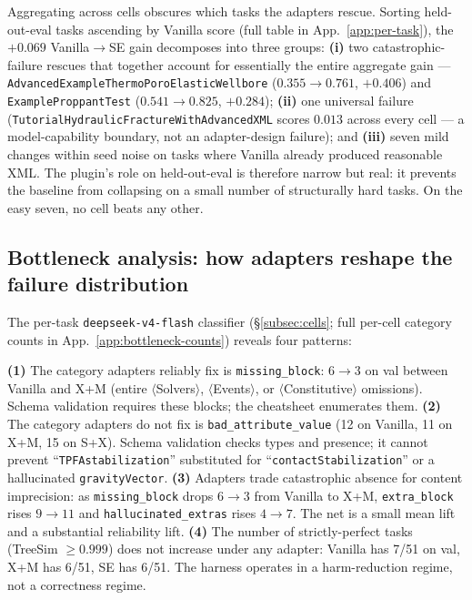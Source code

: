 \documentclass{article}
\begin{document}
Aggregating across cells obscures which tasks the adapters rescue. Sorting held-out-eval tasks ascending by Vanilla score (full table in App.~\ref{app:per-task}), the $+0.069$ Vanilla$\to$SE gain decomposes into three groups: \textbf{(i)} two catastrophic-failure rescues that together account for essentially the entire aggregate gain --- \texttt{AdvancedExampleThermoPoroElasticWellbore} ($0.355 \to 0.761$, $+0.406$) and \texttt{ExampleProppantTest} ($0.541 \to 0.825$, $+0.284$); \textbf{(ii)} one universal failure (\texttt{TutorialHydraulicFractureWithAdvancedXML} scores $0.013$ across every cell --- a model-capability boundary, not an adapter-design failure); and \textbf{(iii)} seven mild changes within seed noise on tasks where Vanilla already produced reasonable XML. The plugin's role on held-out-eval is therefore narrow but real: it prevents the baseline from collapsing on a small number of structurally hard tasks. On the easy seven, no cell beats any other.

\subsection{Bottleneck analysis: how adapters reshape the failure distribution}
\label{subsec:bottleneck-results}

The per-task \texttt{deepseek-v4-flash} classifier (\S\ref{subsec:cells}; full per-cell category counts in App.~\ref{app:bottleneck-counts}) reveals four patterns:

\textbf{(1)} The category adapters reliably fix is \texttt{missing\_block}: $6{\to}3$ on val between Vanilla and X+M (entire $\langle$Solvers$\rangle$, $\langle$Events$\rangle$, or $\langle$Constitutive$\rangle$ omissions). Schema validation requires these blocks; the cheatsheet enumerates them.
\textbf{(2)} The category adapters do not fix is \texttt{bad\_attribute\_value} (12 on Vanilla, 11 on X+M, 15 on S+X). Schema validation checks types and presence; it cannot prevent ``\texttt{TPFAstabilization}'' substituted for ``\texttt{contactStabilization}'' or a hallucinated \texttt{gravityVector}.
\textbf{(3)} Adapters trade catastrophic absence for content imprecision: as \texttt{missing\_block} drops $6{\to}3$ from Vanilla to X+M, \texttt{extra\_block} rises $9{\to}11$ and \texttt{hallucinated\_extras} rises $4{\to}7$. The net is a small mean lift and a substantial reliability lift.
\textbf{(4)} The number of strictly-perfect tasks (TreeSim $\geq 0.999$) does not increase under any adapter: Vanilla has 7/51 on val, X+M has 6/51, SE has 6/51. The harness operates in a harm-reduction regime, not a correctness regime.
\end{document}
